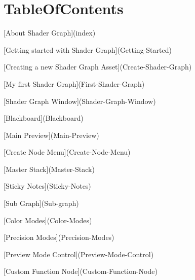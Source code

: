 \chapter{Table\+Of\+Contents}
\hypertarget{md__hey_tea_9_2_library_2_package_cache_2com_8unity_8shadergraph_0d14_80_88_2_documentation_0i_2_table_of_contents}{}\label{md__hey_tea_9_2_library_2_package_cache_2com_8unity_8shadergraph_0d14_80_88_2_documentation_0i_2_table_of_contents}

\begin{DoxyItemize}
\item \mbox{[}About Shader Graph\mbox{]}(index)
\item \mbox{[}Getting started with Shader Graph\mbox{]}(Getting-\/\+Started)
\begin{DoxyItemize}
\item \mbox{[}Creating a new Shader Graph Asset\mbox{]}(Create-\/\+Shader-\/\+Graph)
\item \mbox{[}My first Shader Graph\mbox{]}(First-\/\+Shader-\/\+Graph)
\item \mbox{[}Shader Graph Window\mbox{]}(Shader-\/\+Graph-\/\+Window)
\begin{DoxyItemize}
\item \mbox{[}Blackboard\mbox{]}(Blackboard)
\item \mbox{[}Main Preview\mbox{]}(Main-\/\+Preview)
\item {}
\end{DoxyItemize}
\item \mbox{[}Create Node Menu\mbox{]}(Create-\/\+Node-\/\+Menu)
\item {}
\item \mbox{[}Master Stack\mbox{]}(Master-\/\+Stack)
\item \mbox{[}Sticky Notes\mbox{]}(Sticky-\/\+Notes)
\item \mbox{[}Sub Graph\mbox{]}(Sub-\/graph)
\item \mbox{[}Color Modes\mbox{]}(Color-\/\+Modes)
\item \mbox{[}Precision Modes\mbox{]}(Precision-\/\+Modes)
\item \mbox{[}Preview Mode Control\mbox{]}(Preview-\/\+Mode-\/\+Control)
\item \mbox{[}Custom Function Node\mbox{]}(Custom-\/\+Function-\/\+Node)

\end{DoxyItemize}
\end{DoxyItemize}
